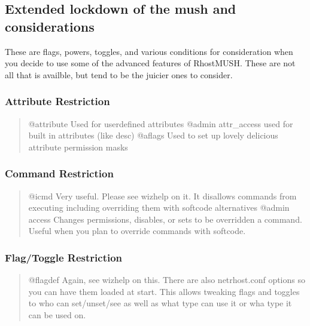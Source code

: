 \documentclass[letterpaper,10pt,english]{sphinxmanual}
\begin{document}
\subsection{Extended lockdown of the mush and considerations}
\label{\detokenize{security:extended-lockdown-of-the-mush-and-considerations}}
\sphinxAtStartPar
These are flags, powers, toggles, and various conditions for consideration
when you decide to use some of the advanced features of RhostMUSH.
These are not all that is availble, but tend to be the juicier ones to consider.


\subsubsection{Attribute Restriction}
\label{\detokenize{security:attribute-restriction}}\begin{quote}

\sphinxAtStartPar
@attribute \textendash{} Used for user\sphinxhyphen{}defined attributes
@admin attr\_access \textendash{} used for built in attributes (like desc)
@aflags \textendash{} Used to set up lovely delicious attribute permission masks
\end{quote}


\subsubsection{Command Restriction}
\label{\detokenize{security:command-restriction}}\begin{quote}

\sphinxAtStartPar
@icmd    \sphinxhyphen{} Very useful.   Please see wizhelp on it.  It disallows commands from executing including overriding them with softcode alternatives
@admin access \sphinxhyphen{} Changes permissions, disables, or sets to be overridden a command.  Useful when you plan to override commands with softcode.
\end{quote}


\subsubsection{Flag/Toggle Restriction}
\label{\detokenize{security:flag-toggle-restriction}}\begin{quote}

\sphinxAtStartPar
@flagdef \sphinxhyphen{} Again, see wizhelp on this.  There are also netrhost.conf options so you can have them loaded at start.  This allows tweaking flags and toggles to who can set/unset/see as well as what type can use it or wha type it can be used on.
\end{quote}
\end{document}
